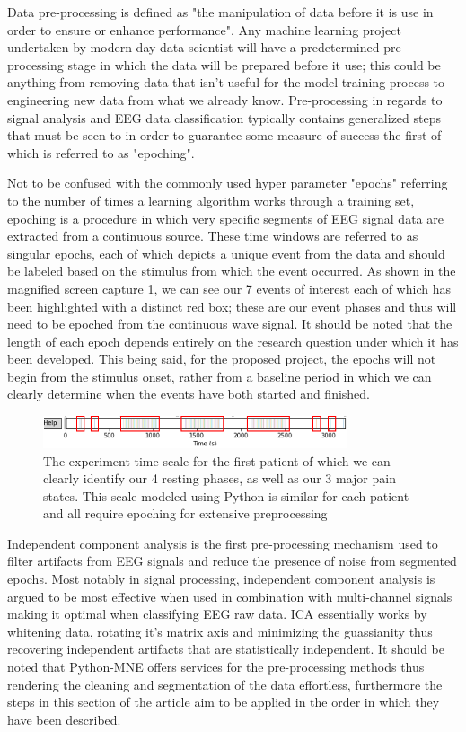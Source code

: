 \documentclass[12pt]{article}
\begin{document}
Data pre-processing is defined as "the manipulation of data before it is use in order to ensure or enhance performance". Any machine learning project undertaken by modern day data scientist will have a predetermined pre-processing stage in which the data will be prepared before it use; this could be anything from removing data that isn't useful for the model training process to engineering new data from what we already know. Pre-processing in regards to signal analysis and EEG data classification typically contains generalized steps that must be seen to in order to guarantee some measure of success the first of which is referred to as "epoching".

Not to be confused with the commonly used hyper parameter "epochs" referring to the number of times a learning algorithm works through a training set, epoching is a procedure in which very specific segments of EEG signal data are extracted from a continuous source. These time windows are referred to as singular epochs, each of which depicts a unique event from the data and should be labeled based on the stimulus from which the event occurred. As shown in the magnified screen capture \ref{fig:Epoch}, we can see our 7 events of interest each of which has been highlighted with a distinct red box; these are our event phases and thus will need to be epoched from the continuous wave signal. It should be noted that the length of each epoch depends entirely on the research question under which it has been developed. This being said, for the proposed project, the epochs will not begin from the stimulus onset, rather from a baseline period in which we can clearly determine when the events have both started and finished.

\begin{figure}[tb]
\centering
\includegraphics[width=0.8\textwidth]{Epoch.png}
\caption{\label{fig:Epoch}The experiment time scale for the first patient of which we can clearly identify our 4 resting phases, as well as our 3 major pain states. This scale modeled using Python is similar for each patient and all require epoching for extensive preprocessing}
\end{figure} 

Independent component analysis is the first pre-processing mechanism used to filter artifacts from EEG signals and reduce the presence of noise from segmented epochs. Most notably in signal processing, independent component analysis is argued to be most effective when used in combination with multi-channel signals making it optimal when classifying EEG raw data. ICA essentially works by whitening data, rotating it's matrix axis and minimizing the guassianity thus recovering independent artifacts that are statistically independent. It should be noted that Python-MNE offers services for the pre-processing methods thus rendering the cleaning and segmentation of the data effortless, furthermore the steps in this section of the article aim to be applied in the order in which they have been described. 
\end{document}
